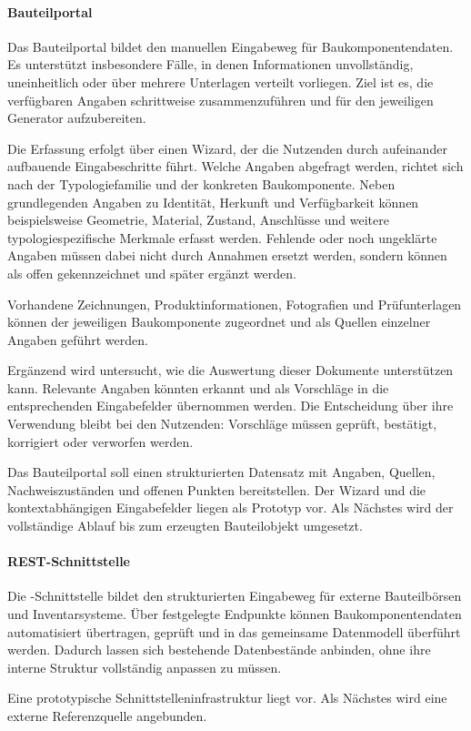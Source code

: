 \documentclass[type=zwischenbericht]{zukunftbau}
\begin{document}
\begin{SemioNest}
\paragraph{Bauteilportal}
Das Bauteilportal bildet den manuellen Eingabeweg für Baukomponentendaten. Es unterstützt insbesondere Fälle, in denen Informationen unvollständig, uneinheitlich oder über mehrere Unterlagen verteilt vorliegen. Ziel ist es, die verfügbaren Angaben schrittweise zusammenzuführen und für den jeweiligen Generator aufzubereiten.

Die Erfassung erfolgt über einen \Gls{Wizard}, der die Nutzenden durch aufeinander aufbauende Eingabeschritte führt. Welche Angaben abgefragt werden, richtet sich nach der Typologiefamilie und der konkreten Baukomponente. Neben grundlegenden Angaben zu Identität, Herkunft und Verfügbarkeit können beispielsweise Geometrie, Material, Zustand, Anschlüsse und weitere typologiespezifische Merkmale erfasst werden. Fehlende oder noch ungeklärte Angaben müssen dabei nicht durch Annahmen ersetzt werden, sondern können als offen gekennzeichnet und später ergänzt werden.

Vorhandene Zeichnungen, Produktinformationen, Fotografien und Prüfunterlagen können der jeweiligen Baukomponente zugeordnet und als Quellen einzelner Angaben geführt werden.

Ergänzend wird untersucht, wie  die Auswertung dieser Dokumente unterstützen kann. Relevante Angaben könnten erkannt und als Vorschläge in die entsprechenden Eingabefelder übernommen werden. Die Entscheidung über ihre Verwendung bleibt bei den Nutzenden: Vorschläge müssen geprüft, bestätigt, korrigiert oder verworfen werden.

Das Bauteilportal soll einen strukturierten Datensatz mit Angaben, Quellen, Nachweiszuständen und offenen Punkten bereitstellen. Der Wizard und die kontextabhängigen Eingabefelder liegen als Prototyp vor. Als Nächstes wird der vollständige Ablauf bis zum erzeugten Bauteilobjekt umgesetzt.

\paragraph{REST-Schnittstelle}
Die -Schnittstelle bildet den strukturierten Eingabeweg für externe Bauteilbörsen und Inventarsysteme. Über festgelegte Endpunkte können Baukomponentendaten automatisiert übertragen, geprüft und in das gemeinsame Datenmodell überführt werden. Dadurch lassen sich bestehende Datenbestände anbinden, ohne ihre interne Struktur vollständig anpassen zu müssen.

Eine prototypische Schnittstelleninfrastruktur liegt vor. Als Nächstes wird eine externe Referenzquelle angebunden.
\end{SemioNest}
\end{document}
